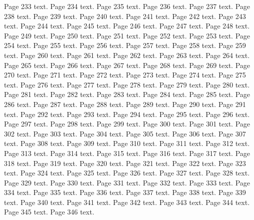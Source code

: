 \documentclass{article}
\begin{document}
Page 233 text.\newpage
Page 234 text.\newpage
Page 235 text.\newpage
Page 236 text.\newpage
Page 237 text.\newpage
Page 238 text.\newpage
Page 239 text.\newpage
Page 240 text.\newpage
Page 241 text.\newpage
Page 242 text.\newpage
Page 243 text.\newpage
Page 244 text.\newpage
Page 245 text.\newpage
Page 246 text.\newpage
Page 247 text.\newpage
Page 248 text.\newpage
Page 249 text.\newpage
Page 250 text.\newpage
Page 251 text.\newpage
Page 252 text.\newpage
Page 253 text.\newpage
Page 254 text.\newpage
Page 255 text.\newpage
Page 256 text.\newpage
Page 257 text.\newpage
Page 258 text.\newpage
Page 259 text.\newpage
Page 260 text.\newpage
Page 261 text.\newpage
Page 262 text.\newpage
Page 263 text.\newpage
Page 264 text.\newpage
Page 265 text.\newpage
Page 266 text.\newpage
Page 267 text.\newpage
Page 268 text.\newpage
Page 269 text.\newpage
Page 270 text.\newpage
Page 271 text.\newpage
Page 272 text.\newpage
Page 273 text.\newpage
Page 274 text.\newpage
Page 275 text.\newpage
Page 276 text.\newpage
Page 277 text.\newpage
Page 278 text.\newpage
Page 279 text.\newpage
Page 280 text.\newpage
Page 281 text.\newpage
Page 282 text.\newpage
Page 283 text.\newpage
Page 284 text.\newpage
Page 285 text.\newpage
Page 286 text.\newpage
Page 287 text.\newpage
Page 288 text.\newpage
Page 289 text.\newpage
Page 290 text.\newpage
Page 291 text.\newpage
Page 292 text.\newpage
Page 293 text.\newpage
Page 294 text.\newpage
Page 295 text.\newpage
Page 296 text.\newpage
Page 297 text.\newpage
Page 298 text.\newpage
Page 299 text.\newpage
Page 300 text.\newpage
Page 301 text.\newpage
Page 302 text.\newpage
Page 303 text.\newpage
Page 304 text.\newpage
Page 305 text.\newpage
Page 306 text.\newpage
Page 307 text.\newpage
Page 308 text.\newpage
Page 309 text.\newpage
Page 310 text.\newpage
Page 311 text.\newpage
Page 312 text.\newpage
Page 313 text.\newpage
Page 314 text.\newpage
Page 315 text.\newpage
Page 316 text.\newpage
Page 317 text.\newpage
Page 318 text.\newpage
Page 319 text.\newpage
Page 320 text.\newpage
Page 321 text.\newpage
Page 322 text.\newpage
Page 323 text.\newpage
Page 324 text.\newpage
Page 325 text.\newpage
Page 326 text.\newpage
Page 327 text.\newpage
Page 328 text.\newpage
Page 329 text.\newpage
Page 330 text.\newpage
Page 331 text.\newpage
Page 332 text.\newpage
Page 333 text.\newpage
Page 334 text.\newpage
Page 335 text.\newpage
Page 336 text.\newpage
Page 337 text.\newpage
Page 338 text.\newpage
Page 339 text.\newpage
Page 340 text.\newpage
Page 341 text.\newpage
Page 342 text.\newpage
Page 343 text.\newpage
Page 344 text.\newpage
Page 345 text.\newpage
Page 346 text.\newpage
\end{document}
